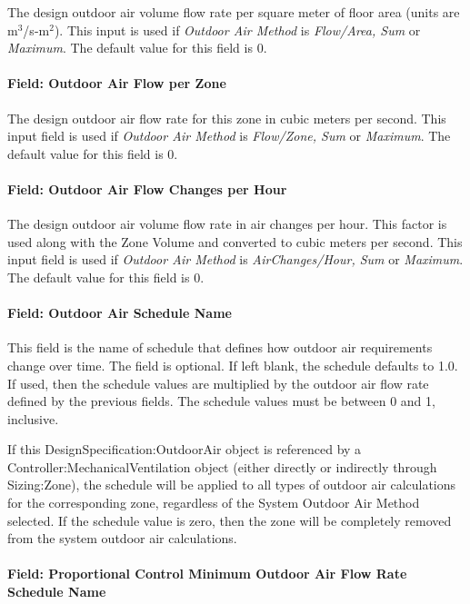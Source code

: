 The design outdoor air volume flow rate per square meter of floor area (units are m\(^{3}\)/s-m\(^{2}\)). This input is used if \emph{Outdoor Air Method} is \emph{Flow/Area, Sum} or \emph{Maximum}. The default value for this field is 0.

\paragraph{Field: Outdoor Air Flow per Zone}\label{field-outdoor-air-flow-per-zone}

The design outdoor air flow rate for this zone in cubic meters per second. This input field is used if \emph{Outdoor Air Method} is \emph{Flow/Zone, Sum} or \emph{Maximum}. The default value for this field is 0.

\paragraph{Field: Outdoor Air Flow Changes per Hour}\label{field-outdoor-air-flow-changes-per-hour}

The design outdoor air volume flow rate in air changes per hour. This factor is used along with the Zone Volume and converted to cubic meters per second. This input field is used if \emph{Outdoor Air Method} is \emph{AirChanges/Hour, Sum} or \emph{Maximum}. The default value for this field is 0.

\paragraph{Field: Outdoor Air Schedule Name}\label{field-outdoor-air-schedule-name}

This field is the name of schedule that defines how outdoor air requirements change over time. The field is optional. If left blank, the schedule defaults to 1.0. If used, then the schedule values are multiplied by the outdoor air flow rate defined by the previous fields. The schedule values must be between 0 and 1, inclusive.  

If this DesignSpecification:OutdoorAir object is referenced by a Controller:MechanicalVentilation object (either directly or indirectly through Sizing:Zone), the schedule will be applied to all types of outdoor air calculations for the corresponding zone, regardless of the System Outdoor Air Method selected. If the schedule value is zero, then the zone will be completely removed from the system outdoor air calculations.

\paragraph{Field: Proportional Control Minimum Outdoor Air Flow Rate Schedule Name }\label{field-proportional-control-minimum-outdoor-air-flow-rate-schedule-name}

